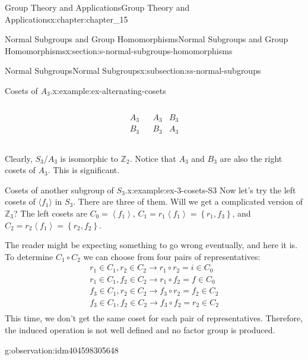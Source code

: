 \documentclass[twoside,10pt,]{book}
\numberwithin{equation}{section}
\begin{document}
\begin{chapterptx}{Group Theory and Applications}{}{Group Theory and Applications}{}{}{x:chapter:chapter_15}
\begin{sectionptx}{Normal Subgroups and Group Homomorphisms}{}{Normal Subgroups and Group Homomorphisms}{}{}{x:section:s-normal-subgroups-homomorphisms}
\begin{subsectionptx}{Normal Subgroups}{}{Normal Subgroups}{}{}{x:subsection:ss-normal-subgroups}
\begin{example}{Cosets of \(A_3\).}{x:example:ex-alternating-cosets}
\begin{equation*}
\begin{array}{c|c}
\begin{array}{cc}
\end{array}
\\
\hline
\begin{array}{c}
A_{3 } \\
B_3 \\
\end{array}
& 
\begin{array}{cc}
A_3 & B_3 \\
B_3 & A_3 \\
\end{array}
\\
\end{array}
\end{equation*}
%
\par
Clearly, \(S_3/A_3\) is isomorphic to \(\mathbb{Z}_2\).   Notice that \(A_3\) and \(B_3\) are also the right cosets of \(A_3\).  This is significant.%
\end{example}
\begin{example}{Cosets of another subgroup of \(S_3\).}{x:example:ex-3-cosets-S3}%
Now let's try the left cosets of \(\langle f_1 \rangle\) in \(S_3\). There are three of them. Will we get a complicated version of \(\mathbb{Z}_3\)? The left cosets are \(C_0=\left\langle f_1\right\rangle\), \(C_1= r_1\left\langle f_1\right\rangle = \left\{r_1,f_3\right\}\),  and \(C_2= r_2\left\langle
f_1\right\rangle = \left\{r_2,f_2\right\}\).%
\par
The reader might be expecting something to go wrong eventually, and here it is. To determine \(C_1\circ C_2\) we can choose from four pairs of representatives:%
\begin{equation*}
\begin{array}{c}
r_1 \in C_1, r_2\in C_2    \longrightarrow  r_1\circ r_2=i\in C_0\\
r_1\in C_1, f_2\in C_2    \longrightarrow  r_1\circ f_2=f\in C_0\\
f_3\in C_1, r_2\in C_2    \longrightarrow  f_3\circ r_2=f_2\in C_2\\
f_3\in C_1, f_2\in C_2    \longrightarrow  f_3\circ f_2=r_2\in C_2\\
\end{array}
\end{equation*}
This time, we don't get the same coset for each pair of representatives. Therefore, the induced operation is not well defined and no factor group is produced.%
\end{example}
\begin{observation}{}{g:observation:idm404598305648}%

\end{observation}
\end{subsectionptx}
\end{sectionptx}
\end{chapterptx}
\end{document}
